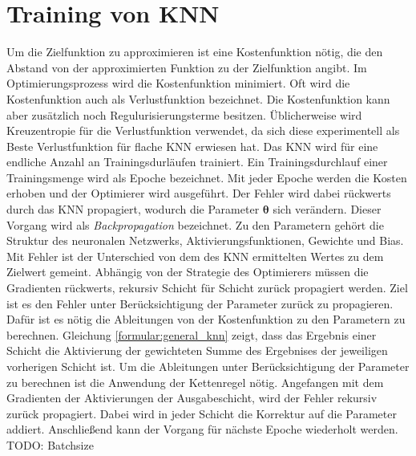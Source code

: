 \section{Training von KNN}
Um die Zielfunktion zu approximieren ist eine Kostenfunktion nötig, die den Abstand von der approximierten Funktion zu der Zielfunktion angibt.
Im Optimierungsprozess wird die Kostenfunktion minimiert. Oft wird die Kostenfunktion auch als Verlustfunktion bezeichnet.
Die Kostenfunktion kann aber zusätzlich noch Regulurisierungsterme besitzen.
Üblicherweise wird Kreuzentropie für die Verlustfunktion verwendet, da sich diese experimentell als Beste Verlustfunktion für flache KNN erwiesen hat.
\newline
\newline
Das KNN wird für eine endliche Anzahl an Trainingsdurläufen trainiert.
Ein Trainingsdurchlauf einer Trainingsmenge wird als Epoche bezeichnet.
Mit jeder Epoche werden die Kosten erhoben und der Optimierer wird ausgeführt.
Der Fehler wird dabei rückwerts durch das KNN propagiert, wodurch die Parameter $\boldsymbol\theta$ sich verändern.
Dieser Vorgang wird als \textit{Backpropagation} bezeichnet.
Zu den Parametern gehört die Struktur des neuronalen Netzwerks, Aktivierungsfunktionen, Gewichte und Bias.
Mit Fehler ist der Unterschied von dem des KNN ermittelten Wertes zu dem Zielwert gemeint.
\newline
\newline
Abhängig von der Strategie des Optimierers müssen die Gradienten rückwerts, rekursiv Schicht für Schicht zurück propagiert werden.
Ziel ist es den Fehler unter Berücksichtigung der Parameter zurück zu propagieren.
Dafür ist es nötig die Ableitungen von der Kostenfunktion zu den Parametern zu berechnen.
Gleichung \ref{formular:general_knn} zeigt, dass das Ergebnis einer Schicht die Aktivierung der gewichteten Summe des
Ergebnises der jeweiligen vorherigen Schicht ist.
Um die Ableitungen unter Berücksichtigung der Parameter zu berechnen ist die Anwendung der Kettenregel nötig.
\newline
\newline
Angefangen mit dem Gradienten der Aktivierungen der Ausgabeschicht, wird der Fehler rekursiv zurück propagiert.
Dabei wird in jeder Schicht die Korrektur auf die Parameter addiert.
Anschließend kann der Vorgang für nächste Epoche wiederholt werden.
\newline
\newline
TODO: Batchsize